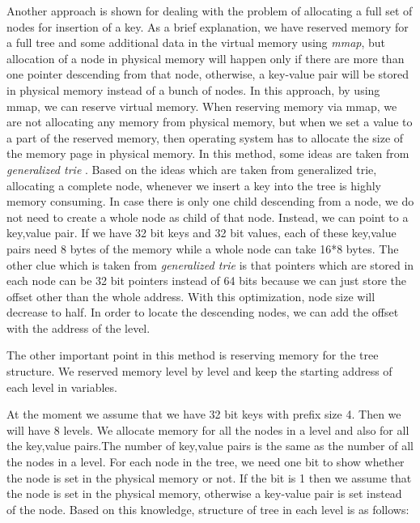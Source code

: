 \documentclass{report}
\begin{document}
Another approach is shown for dealing with the problem of allocating a full set of nodes for insertion of a key. As a brief explanation, we have reserved memory for a full tree and some additional data in the virtual memory using \textit{mmap}, but allocation of a node in physical memory will happen only if there are more than one pointer descending from that node, otherwise, a key-value pair will be stored in physical memory instead of a bunch of nodes. In this approach, by using mmap, we can reserve virtual memory. When reserving memory via mmap, we are not allocating any memory from physical memory, but when we set a value to a part of the reserved memory, then operating system has to allocate the size of the memory page in physical memory. In this method, some ideas are taken from \textit{generalized trie} \cite{Boehm}. Based on the ideas which are taken from generalized trie, allocating a complete node, whenever we insert a key into the tree is highly memory consuming. In case there is only one child descending from a node, we do not need to create a whole node as child of that node. Instead, we can point to a key,value pair. If we have 32 bit keys and 32 bit values, each of these key,value pairs need 8 bytes of the memory while a whole node can take 16*8 bytes. The other clue which is taken from \textit{generalized trie} is that pointers which are stored in each node can be 32 bit pointers instead of 64 bits because we can just store the offset other than the whole address. With this optimization, node size will decrease to half. In order to locate the descending nodes, we can add the offset with the address of the level. 

 The other important point in this method is reserving memory for the tree structure. We reserved memory level by level and keep the starting address of each level in variables. 

At the moment we assume that we have 32 bit keys with prefix size 4. Then we will have 8 levels. We allocate memory for all the nodes in a level and also for all the key,value pairs.The number of key,value pairs is the same as the number of all the nodes in a level. For each node in the tree, we need one bit to show whether the node is set in the physical memory or not. If the bit is 1 then we assume that the node is set in the physical memory, otherwise a key-value pair is set instead of the node. Based on this knowledge, structure of tree in each level is as follows:
 
\end{document}
